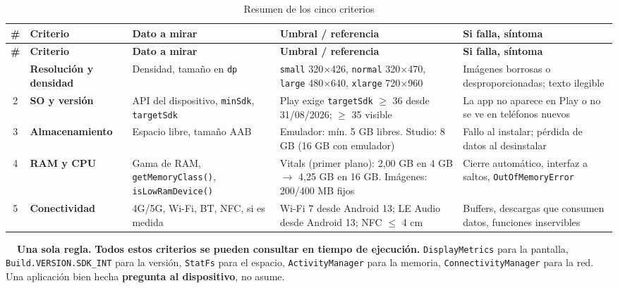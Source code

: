 \documentclass[11pt,a4paper]{article}
\newcommand{\code}[1]{\texttt{\color{ink}#1}}
\begin{document}
	{\footnotesize
		\begin{xltabular}{\textwidth}{@{}c >{\RaggedRight\arraybackslash}p{2.2cm} >{\RaggedRight\arraybackslash}p{3.3cm} >{\RaggedRight\arraybackslash}p{3.5cm} >{\RaggedRight\arraybackslash}X@{}}
			\caption{Resumen de los cinco criterios}\label{tab:resumen}\\
			\toprule
			\textcolor{paper}{\sffamily\bfseries \#} & \textcolor{paper}{\sffamily\bfseries Criterio} & \textcolor{paper}{\sffamily\bfseries Dato a mirar} & \textcolor{paper}{\sffamily\bfseries Umbral / referencia} & \textcolor{paper}{\sffamily\bfseries Si falla, síntoma} \\
			\midrule
			\endfirsthead
			\toprule
			\textcolor{paper}{\sffamily\bfseries \#} & \textcolor{paper}{\sffamily\bfseries Criterio} & \textcolor{paper}{\sffamily\bfseries Dato a mirar} & \textcolor{paper}{\sffamily\bfseries Umbral / referencia} & \textcolor{paper}{\sffamily\bfseries Si falla, síntoma} \\
			\midrule
			\endhead
			\bottomrule
			 & \textbf{Resolución y densidad} & Densidad, tamaño en \code{dp} & \code{small} 320$\times$426, \code{normal} 320$\times$470, \code{large} 480$\times$640, \code{xlarge} 720$\times$960 & Imágenes borrosas o desproporcionadas; texto ilegible \\
			2 & \textbf{SO y versión} & API del dispositivo, \code{minSdk}, \code{targetSdk} & Play exige \code{targetSdk} $\geq$ 36 desde 31/08/2026; $\geq$ 35 visible & La app no aparece en Play o no se ve en teléfonos nuevos \\
			3 & \textbf{Almacenamiento} & Espacio libre, tamaño AAB & Emulador: mín. 5 GB libres. Studio: 8 GB (16 GB con emulador) & Fallo al instalar; pérdida de datos al desinstalar \\
			4 & \textbf{RAM y CPU} & Gama de RAM, \code{getMemoryClass()}, \code{isLowRamDevice()} & Vitals (primer plano): 2,00 GB en 4 GB $\to$ 4,25 GB en 16 GB. Imágenes: 200/400 MB fijos & Cierre automático, interfaz a saltos, \code{OutOfMemoryError} \\
			5 & \textbf{Conectividad} & 4G/5G, Wi-Fi, BT, NFC, si es medida & Wi-Fi 7 desde Android 13; LE Audio desde Android 13; NFC $\leq$ 4 cm & Buffers, descargas que consumen datos, funciones inservibles \\
		\end{xltabular}
	}
	
	\begin{ideabox}
		\textbf{\color{inkdim}\faLightbulb\ \ Una sola regla.}
		\textbf{Todos estos criterios se pueden consultar en tiempo de ejecución.} \code{DisplayMetrics} para la pantalla, \code{Build.VERSION.SDK\_INT} para la versión, \code{StatFs} para el espacio, \code{ActivityManager} para la memoria, \code{ConnectivityManager} para la red. Una aplicación bien hecha \textbf{pregunta al dispositivo}, no asume.
	\end{ideabox}
	
\end{document}
